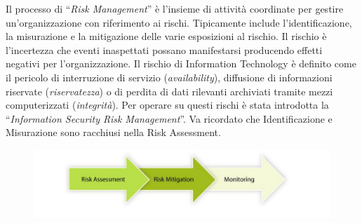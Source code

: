 Il processo di “\textit{Risk Management}” è l'insieme di attività coordinate
per gestire un'organizzazione con riferimento ai rischi.
Tipicamente include l'identificazione, la misurazione e la mitigazione delle
varie esposizioni al rischio.
Il rischio è l'incertezza che eventi inaspettati possano manifestarsi producendo
effetti negativi per l'organizzazione.
Il rischio di Information Technology è definito come il pericolo di interruzione
di servizio (\textit{availability}), diffusione di informazioni riservate
(\textit{riservatezza}) o di perdita di dati rilevanti
archiviati tramite mezzi computerizzati (\textit{integrità}).
Per operare su questi rischi è stata introdotta la
“\textit{Information Security Risk Management}”.
Va ricordato che Identificazione e Misurazione sono racchiusi nella
Risk Assessment.

\begin{figure}[H]
    \centering
    \includegraphics[width=12cm, keepaspectratio]{capitoli/risks/imgs/risk1.png}
\end{figure}